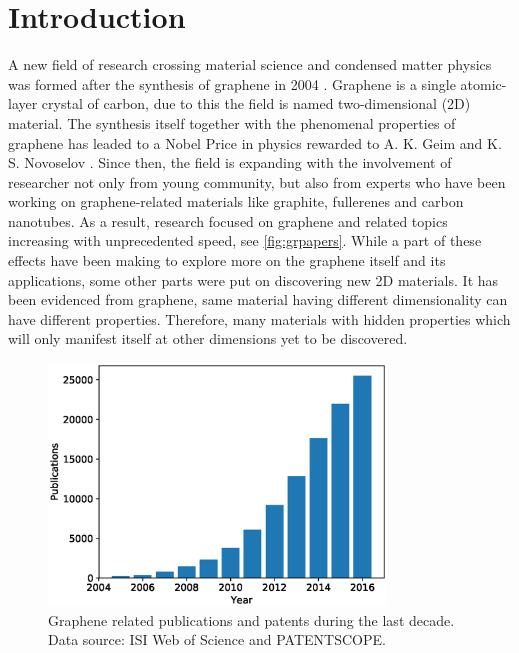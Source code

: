 
\chapter{Introduction \label{chap:1}}  %

\ifpdf
    \graphicspath{{Chapter1/Figs/Raster/}{Chapter1/Figs/PDF/}{Chapter1/Figs/}{Chapter1/Figs/Vector/}}
\else
    \graphicspath{{Chapter1/Figs/Vector/}{Chapter1/Figs/}}
\fi


A new field of research crossing material science and condensed matter physics was formed after the synthesis of graphene in 2004 \cite{Novoselov666,Novoselov26072005}. Graphene is a single atomic-layer crystal of carbon, due to this the field is named two-dimensional (2D) material. The synthesis itself together with the phenomenal properties of graphene has leaded to a Nobel Price in physics rewarded to A. K. Geim and K. S. Novoselov \cite{Geim2007}. Since then, the field is expanding with the involvement of researcher not only from young community, but also from experts who have been working on graphene-related materials like graphite, fullerenes and carbon nanotubes. As a result, research focused on graphene and related topics increasing with unprecedented speed, see \autoref{fig:grpapers}. While a part of these effects have been making to explore more on the graphene itself and its applications, some other parts were put on discovering new 2D materials. It has been evidenced from graphene, same material having different dimensionality can have different properties. Therefore, many materials with hidden properties which will only manifest itself at other dimensions yet to be discovered. 


\begin{figure}[htbp!] 
\centering  
\includegraphics[width=0.8\textwidth]{graphene_papers.eps}
\caption[Graphene publications]{Graphene related publications and patents during the last decade. Data source: ISI Web of Science and PATENTSCOPE. \protect\footnotemark }  
\label{fig:grpapers}
\end{figure} 

